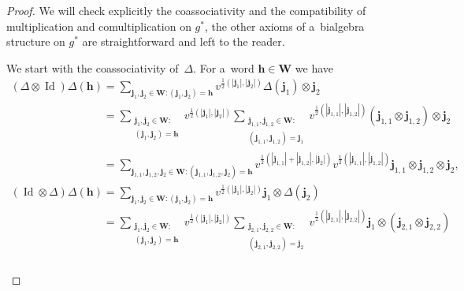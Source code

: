 \documentclass[pdftex]{sigma}
\numberwithin{equation}{section}
\begin{document}
\begin{proof}
We will check explicitly the coassociativity and the compatibility of multiplication and comultiplication on $g^*$, the
other axioms of a~bialgebra structure on $g^*$ are straightforward and left to the reader.

We start with the coassociativity of~$\Delta$.
For a~word $\mathbf{h}\in\mathbf{W}$ we have
\begin{gather*}
(\Delta\otimes\operatorname{Id})\Delta(\mathbf{h})
=\sum\limits_{\mathbf{j}_1,\mathbf{j}_2\in\mathbf{W}:(\mathbf{j}_1,\mathbf{j}_2)=\mathbf{h}}
v^{\frac{1}{2}(|\mathbf{j}_1|,|\mathbf{j}_2|)}\Delta(\mathbf{j}_1)
\otimes\mathbf{j}_2
\\
\phantom{(\Delta\otimes\operatorname{Id})\Delta(\mathbf{h})}
=\sum\limits_{\substack{\mathbf{j}_1,\mathbf{j}_2\in\mathbf{W}:\\(\mathbf{j}_1,\mathbf{j}_2)=\mathbf{h}}}
v^{\frac{1}{2}(|\mathbf{j}_1|,|\mathbf{j}_2|)}
\sum\limits_{\substack{\mathbf{j}_{1,1},\mathbf{j}_{1,2}\in\mathbf{W}:\\(\mathbf{j}_{1,1},\mathbf{j}_{1,2})=\mathbf{j}_1}}
v^{\frac{1}{2}(|\mathbf{j}_{1,1}|,|\mathbf{j}_{1,2}|)}(\mathbf{j}_{1,1}\otimes\mathbf{j}_{1,2})
\otimes\mathbf{j}_2
\\
\phantom{(\Delta\otimes\operatorname{Id})\Delta(\mathbf{h})}
=\sum\limits_{\mathbf{j}_{1,1},\mathbf{j}_{1,2},\mathbf{j}_2\in\mathbf{W}:(\mathbf{j}_{1,1},\mathbf{j}_{1,2},\mathbf{j}_2)=\mathbf{h}}
v^{\frac{1}{2}(|\mathbf{j}_{1,1}|+|\mathbf{j}_{1,2}|,|\mathbf{j}_2|)}
v^{\frac{1}{2}(|\mathbf{j}_{1,1}|,|\mathbf{j}_{1,2}|)}\mathbf{j}_{1,1}\otimes\mathbf{j}_{1,2}\otimes\mathbf{j}_2,
\\
(\operatorname{Id}\otimes\Delta)\Delta(\mathbf{h})
=\sum\limits_{\mathbf{j}_1,\mathbf{j}_2\in\mathbf{W}:(\mathbf{j}_1,\mathbf{j}_2)=\mathbf{h}}
v^{\frac{1}{2}(|\mathbf{j}_1|,|\mathbf{j}_2|)}\mathbf{j}_1\otimes\Delta(\mathbf{j}_2)
\\
\phantom{(\operatorname{Id}\otimes\Delta)\Delta(\mathbf{h})}
=\sum\limits_{\substack{\mathbf{j}_1,\mathbf{j}_2\in\mathbf{W}:\\(\mathbf{j}_1,\mathbf{j}_2)=\mathbf{h}}}
v^{\frac{1}{2}(|\mathbf{j}_1|,|\mathbf{j}_2|)}
\sum\limits_{\substack{\mathbf{j}_{2,1},\mathbf{j}_{2,2}\in\mathbf{W}:\\(\mathbf{j}_{2,1},\mathbf{j}_{2,2})=\mathbf{j}_2}}
v^{\frac{1}{2}(|\mathbf{j}_{2,1}|,|\mathbf{j}_{2,2}|)}\mathbf{j}_1\otimes(\mathbf{j}_{2,1}\otimes\mathbf{j}_{2,2})
\\
\phantom{(\operatorname{Id}\otimes\Delta)\Delta(\mathbf{h})}

\end{gather*}
\end{proof}
\end{document}
